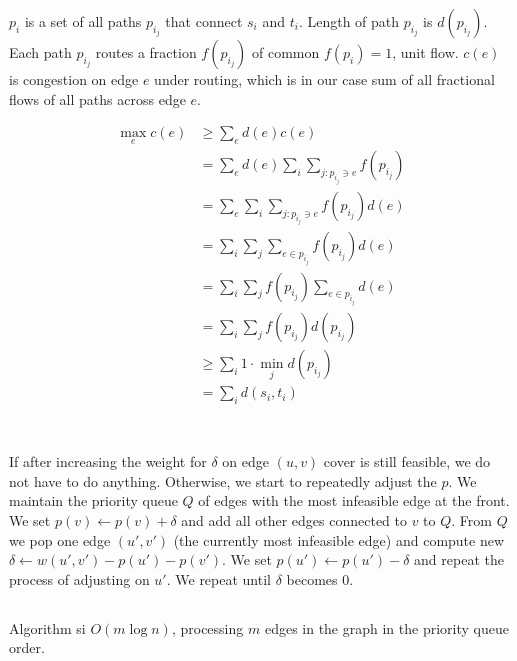 \documentclass[a4paper,11pt,oneside,onecolumn]{article}
\begin{document}
$p_i$ is a set of all paths $p_{i_j}$ that connect $s_i$ and $t_i$.
Length of path $p_{i_j}$ is $d(p_{i_j})$. Each path $p_{i_j}$ routes a fraction $f(p_{i_j})$ of common
$f(p_{i}) = 1$, unit flow.
$c(e)$ is congestion on edge $e$ under routing,
which is in our case sum of all fractional flows of all paths across edge $e$.

\begin{align*}
\max_e c(e) & \ge \sum_e d(e) c(e) \\
 & = \sum_e d(e) \sum_i \sum_{j:p_{i_j} \ni e} f(p_{i_j}) \\
 & = \sum_e \sum_i \sum_{j:p_{i_j} \ni e} f(p_{i_j}) d(e) \\
 & = \sum_i \sum_j \sum_{e \in p_{i_j}} f(p_{i_j}) d(e) \\
 & = \sum_i \sum_j f(p_{i_j}) \sum_{e \in p_{i_j}} d(e) \\
 & = \sum_i \sum_j f(p_{i_j}) d(p_{i_j}) \\
 & \ge \sum_i 1 \cdot \min_j d(p_{i_j}) \\
 & = \sum_i d(s_i, t_i) \\
\end{align*}

\setcounter{section}{2}

\section{}

\subsection{}

If after increasing the weight for $\delta$ on edge $(u, v)$ cover is still feasible, we do not have to do anything. Otherwise,
we start to repeatedly adjust the $p$. We maintain the priority queue $Q$ of edges with the most infeasible edge at the front.
We set $p(v) \gets p(v) + \delta$ and add all other edges connected to $v$ to $Q$. From $Q$ we pop one edge $(u', v')$ (the currently most
infeasible edge) and compute new $\delta \gets w(u', v') - p(u') - p(v')$. We set $p(u') \gets p(u') - \delta$ and repeat the process
of adjusting on $u'$. We repeat until $\delta$ becomes $0$.

\subsection{}

Algorithm si $O(m \log n)$, processing $m$ edges in the graph in the priority queue order.
\end{document}
